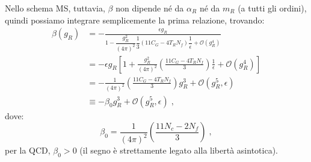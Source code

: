 \documentclass[12pt,a4paper]{article}
\theoremstyle{definition}
\numberwithin{equation}{section}
\begin{document}
Nello schema MS, tuttavia, $\beta$ non dipende né da $\alpha_R$ né da $m_R$ (a tutti gli ordini), quindi possiamo integrare semplicemente la prima relazione, trovando:
\begin{align*}
\beta(g_R) &= -\frac{\epsilon g_R}{1-\dfrac{g_R^2}{(4\pi)^2}\dfrac{1}{3}\left(11C_G-4T_RN_f\right)\dfrac{1}{\epsilon}+\mathcal{O}(g_R^4)} \\
&= -\epsilon g_R\left[1+\frac{g_R^2}{(4\pi)^2}\left(\frac{11C_G-4T_RN_f}{3}\right)\frac{1}{\epsilon}+\mathcal{O}(g_R^4)\right] \\
&= -\frac{1}{(4\pi)^2}\left(\frac{11C_G-4T_RN_f}{3}\right)g_R^3+\mathcal{O}(g_R^5,\epsilon) \\
&\equiv -\beta_0g_R^3+\mathcal{O}(g_R^5,\epsilon)\;,
\end{align*}
dove:
\begin{equation}
\beta_0=\frac{1}{(4\pi)^2}\left(\frac{11N_c-2N_f}{3}\right)\;,
\end{equation}
per la QCD, $\beta_0>0$ (il segno è strettamente legato alla libertà asintotica).
\end{document}
